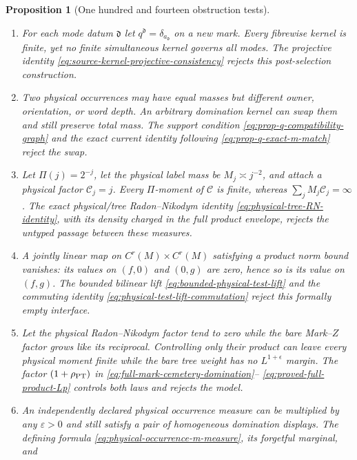 \documentclass[11pt]{article}
\newtheorem{proposition}[theorem]{Proposition}
\begin{document}
\begin{proposition}[One hundred and fourteen obstruction tests]
\begin{enumerate}[label=\textup{(T\arabic*)}]
      one in every row.  All coordinates exist separately but the tuple is
      not a bounded product test.  The uniform lift
      \eqref{eq:bounded-physical-test-lift} rejects this model.
\item For each mode datum $\mathfrak d$ let
      $q^{\mathfrak d}=\delta_{a_{\mathfrak d}}$ on a new mark.  Every
      fibrewise kernel is finite, yet no finite simultaneous kernel governs
      all modes.  The projective identity
      \eqref{eq:source-kernel-projective-consistency} rejects this
      post-selection construction.
\item Two physical occurrences may have equal masses but different owner,
      orientation, or word depth.  An arbitrary domination kernel can swap
      them and still preserve total mass.  The support condition
      \eqref{eq:prop-q-compatibility-graph} and the exact current identity
      following \eqref{eq:prop-q-exact-m-match} reject the swap.
\item Let $\Pi(j)=2^{-j}$, let the physical label mass be
      $M_j\asymp j^{-2}$, and attach a physical factor $\mathcal C_j=j$.
      Every $\Pi$-moment of $\mathcal C$ is finite, whereas
      $\sum_jM_j\mathcal C_j=\infty$.  The exact physical/tree
      Radon--Nikodym identity \eqref{eq:physical-tree-RN-identity}, with its
      density charged in the full product envelope, rejects the untyped
      passage between these measures.
\item A jointly linear map on
      $C^r(M)\times C^r(M)$ satisfying a product norm bound vanishes: its
      values on $(f,0)$ and $(0,g)$ are zero, hence so is its value on
      $(f,g)$.  The bounded \emph{bilinear} lift
      \eqref{eq:bounded-physical-test-lift} and the commuting identity
      \eqref{eq:physical-test-lift-commutation} reject this formally empty
      interface.
\item Let the physical Radon--Nikodym factor tend to zero while the bare
      Mark--$Z$ factor grows like its reciprocal.  Controlling only their
      product can leave every physical moment finite while the bare tree
      weight has no $L^{1+\epsilon}$ margin.  The factor
      $(1+\rho_{\rm PT})$ in
      \eqref{eq:full-mark-cemetery-domination}--
      \eqref{eq:proved-full-product-Lp} controls both laws and rejects the
      model.
\item An independently declared physical occurrence measure can be
      multiplied by any $\varepsilon>0$ and still satisfy a pair of
      homogeneous domination displays.  The defining formula
      \eqref{eq:physical-occurrence-m-measure}, its forgetful marginal, and

\end{enumerate}
\end{proposition}
\end{document}
